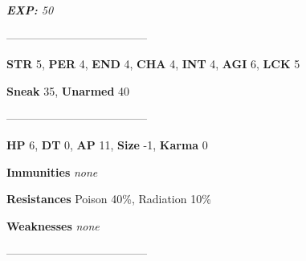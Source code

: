 \documentclass[11pt,a4paper,twocolumn]{book}
\begin{document}
	\noindent
	\emph{\textbf{EXP:} 50}
	
%		
%	
%		

		--------------------------------------
	
	\noindent
	\textbf{STR} 5, \textbf{PER} 4, \textbf{END} 4, \textbf{CHA} 4, \textbf{INT} 4, \textbf{AGI} 6, \textbf{LCK} 5
	
	\noindent
	\textbf{Sneak} 35, \textbf{Unarmed} 40	%
	
	--------------------------------------
	
	\noindent
	\textbf{HP} 6, \textbf{DT} 0, \textbf{AP} 11, \textbf{Size} -1, \textbf{Karma} 0
	
	
	\noindent
	\textbf{Immunities} \emph{none} %
	
	\noindent
	\textbf{Resistances} Poison 40\%, Radiation 10\%%
	
	\noindent
	\textbf{Weaknesses} \emph{none}%
	
	--------------------------------------
	
\end{document}
